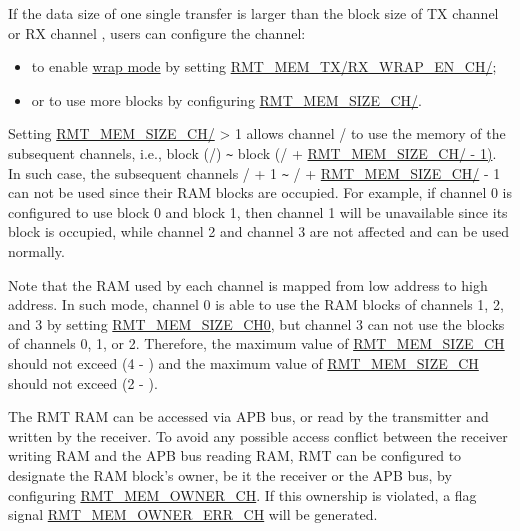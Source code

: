 \documentclass[main\_\_EN.tex]{subfiles}
\begin{document}
If the data size of one single transfer is larger than the block size of TX channel  or RX channel , users can configure the channel:
\begin{itemize}
    \item to enable \hyperref[sec:wrap-tx-mode]{wrap mode} by setting \hyperref[fielddesc:RMTMEMTXWRAPENCHN]{RMT\_MEM\_TX/RX\_WRAP\_EN\_CH/};
    \item or to use more blocks by configuring \hyperref[fielddesc:RMTMEMSIZECHN]{RMT\_MEM\_SIZE\_CH/}.
\end{itemize}

Setting \hyperref[fielddesc:RMTMEMSIZECHN]{RMT\_MEM\_SIZE\_CH/} > 1 allows channel / to use the memory of the subsequent channels, i.e., block (/) \verb+~+ block (/ + \hyperref[fielddesc:RMTMEMSIZECHN]{RMT\_MEM\_SIZE\_CH/ - 1)}. In such case, the subsequent channels / + 1 \verb+~+ / + \hyperref[fielddesc:RMTMEMSIZECHN]{RMT\_MEM\_SIZE\_CH/} - 1 can not be used since their RAM blocks are occupied. For example, if channel 0 is configured to use block 0 and block 1, then channel 1 will be unavailable since its block is occupied, while channel 2 and channel 3 are not affected and can be used normally.

Note that the RAM used by each channel is mapped from low address to high address. In such mode, channel 0 is able to use the RAM blocks of channels 1, 2, and 3 by setting \hyperref[fielddesc:RMTMEMSIZECHN]{RMT\_MEM\_SIZE\_CH0}, but channel 3 can not use the blocks of channels 0, 1, or 2. Therefore, the maximum value of \hyperref[fielddesc:RMTMEMSIZECHN]{RMT\_MEM\_SIZE\_CH} should not exceed (4 - ) and the maximum value of \hyperref[fielddesc:RMTMEMSIZECHM]{RMT\_MEM\_SIZE\_CH} should not exceed (2 - ).

The RMT RAM can be accessed via APB bus, or read by the transmitter and written by the receiver. To avoid any possible access conflict between the receiver writing RAM and the APB bus reading RAM, RMT can be configured to designate the RAM block’s owner, be it the receiver or the APB bus, by configuring \hyperref[fielddesc:RMTMEMOWNERCHM]{RMT\_MEM\_OWNER\_CH}. If this ownership is violated, a flag signal \hyperref[fielddesc:RMTMEMOWNERERRCHM]{RMT\_MEM\_OWNER\_ERR\_CH} will be generated. 
\end{document}
